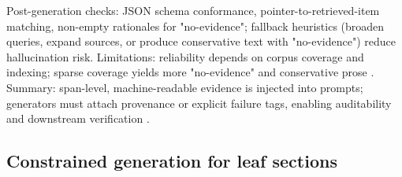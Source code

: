 \documentclass{article}%
\begin{document}
Post-generation checks: JSON schema conformance, pointer-to-retrieved-item matching, non-empty rationales for "no-evidence"; fallback heuristics (broaden queries, expand sources, or produce conservative text with "no-evidence") reduce hallucination risk.
Limitations: reliability depends on corpus coverage and indexing; sparse coverage yields more "no-evidence" and conservative prose \cite{web_macavaney_2018_overcoming_low_utility_facets_for_complex_answer}.
Summary: span-level, machine-readable evidence is injected into prompts; generators must attach provenance or explicit failure tags, enabling auditability and downstream verification \cite{web_huo_2023_retrieving_supporting_evidence_for_generative_qu}.%

%
\subsection{Constrained generation for leaf sections}%
\end{document}
